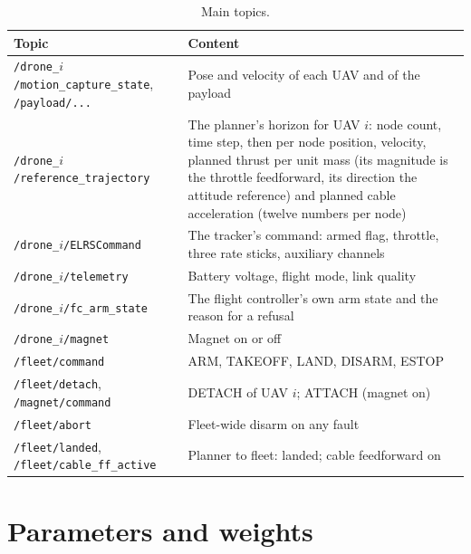 \begin{table}[H]
\centering
\small
\caption{Main topics.}
\label{tab:app_topics}
\begin{tabularx}{\textwidth}{lX}
\toprule
Topic & Content \\
\midrule
\texttt{/drone\_}$i$\texttt{/motion\_capture\_state}, \texttt{/payload/...} & Pose and velocity of each UAV and of the payload \\
\texttt{/drone\_}$i$\texttt{/reference\_trajectory} & The planner's horizon for UAV $i$: node count, time step, then per node position, velocity, planned thrust per unit mass (its magnitude is the throttle feedforward, its direction the attitude reference) and planned cable acceleration (twelve numbers per node) \\
\texttt{/drone\_}$i$\texttt{/ELRSCommand} & The tracker's command: armed flag, throttle, three rate sticks, auxiliary channels \\
\texttt{/drone\_}$i$\texttt{/telemetry} & Battery voltage, flight mode, link quality \\
\texttt{/drone\_}$i$\texttt{/fc\_arm\_state} & The flight controller's own arm state and the reason for a refusal \\
\texttt{/drone\_}$i$\texttt{/magnet} & Magnet on or off \\
\texttt{/fleet/command} & ARM, TAKEOFF, LAND, DISARM, ESTOP \\
\texttt{/fleet/detach}, \texttt{/magnet/command} & DETACH of UAV $i$; ATTACH (magnet on) \\
\texttt{/fleet/abort} & Fleet-wide disarm on any fault \\
\texttt{/fleet/landed}, \texttt{/fleet/cable\_ff\_active} & Planner to fleet: landed; cable feedforward on \\
\bottomrule
\end{tabularx}
\end{table}

\section{Parameters and weights}
\label{sec:app_params}


